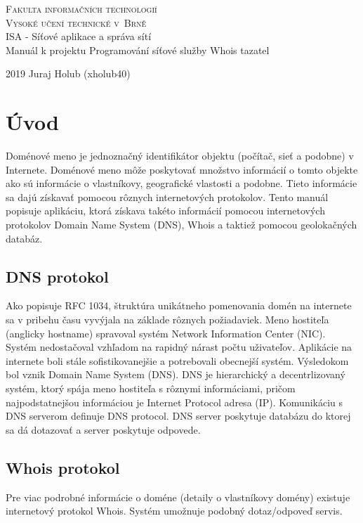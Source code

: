 \documentclass[a4paper, 11pt]{article}
\begin{document}
\begin{titlepage}
	\begin{center}
		\Huge
		\textsc{Fakulta informačních technologií \\
			Vysoké učení technické v~Brně} \\
		{\LARGE
			ISA - Síťové aplikace a správa sítí \\ 
			\medskip \Large{Manuál k projektu 
				Programování síťové služby Whois tazatel}
			}
	\end{center}
		\setlength{\parindent}{0.3em}
		{\Large 2019 \hfill
			Juraj Holub (xholub40)}
\end{titlepage}

\tableofcontents
\newpage

\section{Úvod}
Doménové meno je jednoznačný identifikátor objektu (počítač, sieť a podobne) v Internete. Doménové meno môže poskytovať množstvo informácií o tomto objekte ako sú informácie o vlastníkovy, geografické vlastosti a podobne. Tieto informácie sa dajú získavať pomocou rôznych internetových protokolov. Tento manuál popisuje aplikáciu, ktorá získava takéto informácií pomocou internetových protokolov Domain Name System (DNS), Whois a taktiež pomocou geolokačných databáz.

\subsection{DNS protokol}
Ako popisuje RFC 1034\cite{RFC1034}, štruktúra unikátneho pomenovania domén na internete sa v pribehu času vyvýjala na základe rôznych požiadaviek. Meno hostiteľa (anglicky hostname) spravoval systém Network Information Center (NIC). Systém nedostačoval vzhľadom na rapidný nárast počtu uživateľov. Aplikácie na internete boli stále sofistikovanejšie a potrebovali obecnejší systém. Výsledokom bol vznik Domain Name System (DNS). DNS je hierarchický a decentrlizovaný systém, ktorý spája meno hostiteľa s rôznymi informáciami, pričom najpodstatnejšou informáciou je Internet Protocol adresa (IP). Komunikáciu s DNS serverom definuje DNS protocol. DNS server poskytuje databázu do ktorej sa dá dotazovať a server poskytuje odpovede.

\subsection{Whois protokol}
Pre viac podrobné informácie o doméne (detaily o vlastníkovy domény) existuje internetový protokol Whois\cite{RFC3912}. Systém umožnuje podobný dotaz/odpoveď servis.
\end{document}
